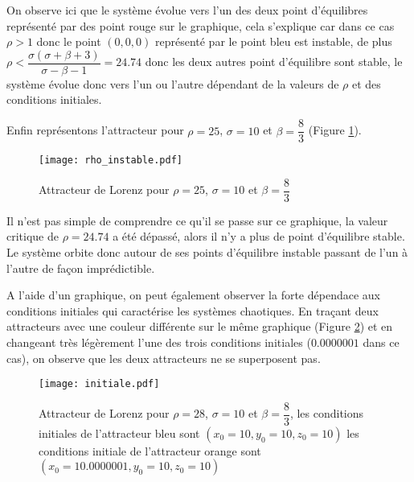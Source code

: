 On observe ici que le système évolue vers l'un des deux point d'équilibres représenté par des point rouge sur le graphique, cela s'explique car dans ce cas $\rho>1$ donc le point $(0,0,0)$ représenté par le point bleu est instable, de plus $\rho < \dfrac{\sigma(\sigma+\beta+3)}{\sigma-\beta-1}=24.74$ donc les deux autres point d'équilibre sont stable, le système évolue donc vers l'un ou l'autre dépendant de la valeurs de $\rho$ et des conditions initiales.  

Enfin représentons l'attracteur pour $\rho=25$, $\sigma=10$ et $\beta=\dfrac{8}{3}$ (Figure \ref{fig:rho_instable}).

\begin{figure}[!ht]
    \centering
    \texttt{[image: rho\_instable.pdf]}
    \caption{\label{fig:rho_instable}Attracteur de Lorenz pour $\rho=25$, $\sigma=10$ et $\beta=\dfrac{8}{3}$} 
\end{figure}

Il n'est pas simple de comprendre ce qu'il se passe sur ce graphique, la valeur critique de $\rho=24.74$ a été dépassé, alors il n'y a plus de point d'équilibre stable. Le système orbite donc autour de ses points d'équilibre instable passant de l'un à l'autre de façon imprédictible.

A l'aide d'un graphique, on peut également observer la forte dépendace aux conditions initiales qui caractérise les systèmes chaotiques. En traçant deux attracteurs avec une couleur différente sur le même graphique (Figure \ref{fig:initiale}) et en changeant très légèrement l'une des trois conditions initiales ($0.0000001$ dans ce cas), on observe que les deux attracteurs ne se superposent pas.

\begin{figure}[!ht]
    \centering
    \texttt{[image: initiale.pdf]}
    \caption{\label{fig:initiale}Attracteur de Lorenz pour $\rho=28$, $\sigma=10$ et $\beta=\dfrac{8}{3}$, les conditions initiales de l'attracteur bleu sont $(x_0=10,y_0=10,z_0=10)$ les conditions initiale de l'attracteur orange sont $(x_0=10.0000001,y_0=10,z_0=10)$} 
\end{figure}

